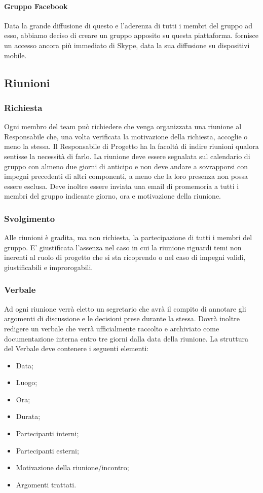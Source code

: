 \paragraph{Gruppo Facebook}
Data la grande diffusione di questo  e l'aderenza di tutti i membri del gruppo ad esso, abbiamo deciso di creare un gruppo apposito su questa piattaforma.  fornisce un accesso ancora più immediato di Skype, data la sua diffusione su dispositivi mobile.  

\subsection{Riunioni}
\label{3.3}

\subsubsection{Richiesta}
\label{3.3.1}
Ogni membro del team può richiedere che venga organizzata una riunione al Responsabile che, una volta verificata la motivazione della richiesta, accoglie o meno la stessa.
Il Responsabile di Progetto ha la facoltà di indire riunioni qualora sentisse la necessità di farlo.
La riunione deve essere segnalata sul calendario di gruppo con almeno due giorni di anticipo e non deve andare a sovrapporsi con impegni precedenti di altri componenti, a meno che la loro presenza non possa essere esclusa. Deve inoltre essere inviata una email di promemoria a tutti i membri del gruppo indicante giorno, ora e motivazione della riunione.

\subsubsection{Svolgimento}
\label{3.3.2}
Alle riunioni è gradita, ma non richiesta, la partecipazione di tutti i membri del gruppo. E' giustificata l'assenza nel caso in cui la riunione riguardi temi non inerenti al ruolo di progetto che si sta ricoprendo o nel caso di impegni validi, giustificabili e improrogabili.

\subsubsection{Verbale}
\label{3.3.3}
Ad ogni riunione verrà eletto un segretario che avrà il compito di annotare gli argomenti di discussione e le decisioni prese durante la stessa.
Dovrà inoltre redigere un verbale che verrà ufficialmente raccolto e archiviato come documentazione interna entro tre giorni dalla data della riunione.
La struttura del Verbale deve contenere i seguenti elementi:
\begin{itemize}
\item Data;
\item Luogo;
\item Ora;
\item Durata;
\item Partecipanti interni;
\item Partecipanti esterni;
\item Motivazione della riunione/incontro;
\item Argomenti trattati.
\end{itemize}

